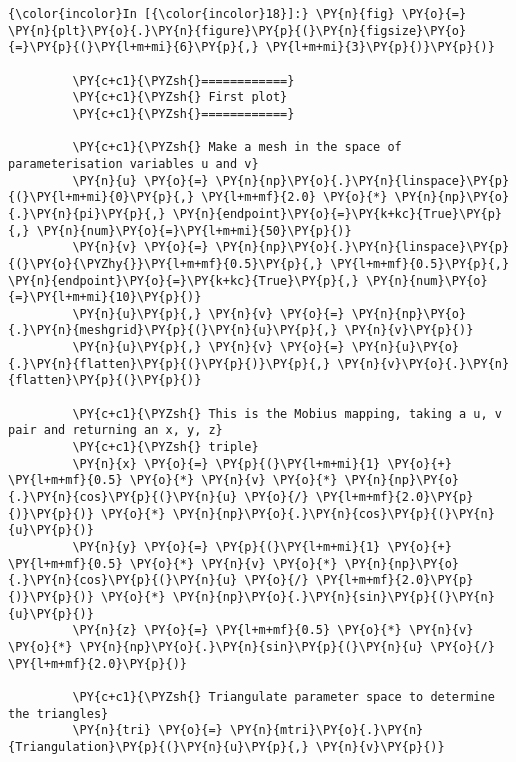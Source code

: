     \begin{Verbatim}[commandchars=\\\{\},frame=single,framerule=0.3mm,rulecolor=\color{cellframecolor}]
{\color{incolor}In [{\color{incolor}18}]:} \PY{n}{fig} \PY{o}{=} \PY{n}{plt}\PY{o}{.}\PY{n}{figure}\PY{p}{(}\PY{n}{figsize}\PY{o}{=}\PY{p}{(}\PY{l+m+mi}{6}\PY{p}{,} \PY{l+m+mi}{3}\PY{p}{)}\PY{p}{)}
         
         \PY{c+c1}{\PYZsh{}============}
         \PY{c+c1}{\PYZsh{} First plot}
         \PY{c+c1}{\PYZsh{}============}
         
         \PY{c+c1}{\PYZsh{} Make a mesh in the space of parameterisation variables u and v}
         \PY{n}{u} \PY{o}{=} \PY{n}{np}\PY{o}{.}\PY{n}{linspace}\PY{p}{(}\PY{l+m+mi}{0}\PY{p}{,} \PY{l+m+mf}{2.0} \PY{o}{*} \PY{n}{np}\PY{o}{.}\PY{n}{pi}\PY{p}{,} \PY{n}{endpoint}\PY{o}{=}\PY{k+kc}{True}\PY{p}{,} \PY{n}{num}\PY{o}{=}\PY{l+m+mi}{50}\PY{p}{)}
         \PY{n}{v} \PY{o}{=} \PY{n}{np}\PY{o}{.}\PY{n}{linspace}\PY{p}{(}\PY{o}{\PYZhy{}}\PY{l+m+mf}{0.5}\PY{p}{,} \PY{l+m+mf}{0.5}\PY{p}{,} \PY{n}{endpoint}\PY{o}{=}\PY{k+kc}{True}\PY{p}{,} \PY{n}{num}\PY{o}{=}\PY{l+m+mi}{10}\PY{p}{)}
         \PY{n}{u}\PY{p}{,} \PY{n}{v} \PY{o}{=} \PY{n}{np}\PY{o}{.}\PY{n}{meshgrid}\PY{p}{(}\PY{n}{u}\PY{p}{,} \PY{n}{v}\PY{p}{)}
         \PY{n}{u}\PY{p}{,} \PY{n}{v} \PY{o}{=} \PY{n}{u}\PY{o}{.}\PY{n}{flatten}\PY{p}{(}\PY{p}{)}\PY{p}{,} \PY{n}{v}\PY{o}{.}\PY{n}{flatten}\PY{p}{(}\PY{p}{)}
         
         \PY{c+c1}{\PYZsh{} This is the Mobius mapping, taking a u, v pair and returning an x, y, z}
         \PY{c+c1}{\PYZsh{} triple}
         \PY{n}{x} \PY{o}{=} \PY{p}{(}\PY{l+m+mi}{1} \PY{o}{+} \PY{l+m+mf}{0.5} \PY{o}{*} \PY{n}{v} \PY{o}{*} \PY{n}{np}\PY{o}{.}\PY{n}{cos}\PY{p}{(}\PY{n}{u} \PY{o}{/} \PY{l+m+mf}{2.0}\PY{p}{)}\PY{p}{)} \PY{o}{*} \PY{n}{np}\PY{o}{.}\PY{n}{cos}\PY{p}{(}\PY{n}{u}\PY{p}{)}
         \PY{n}{y} \PY{o}{=} \PY{p}{(}\PY{l+m+mi}{1} \PY{o}{+} \PY{l+m+mf}{0.5} \PY{o}{*} \PY{n}{v} \PY{o}{*} \PY{n}{np}\PY{o}{.}\PY{n}{cos}\PY{p}{(}\PY{n}{u} \PY{o}{/} \PY{l+m+mf}{2.0}\PY{p}{)}\PY{p}{)} \PY{o}{*} \PY{n}{np}\PY{o}{.}\PY{n}{sin}\PY{p}{(}\PY{n}{u}\PY{p}{)}
         \PY{n}{z} \PY{o}{=} \PY{l+m+mf}{0.5} \PY{o}{*} \PY{n}{v} \PY{o}{*} \PY{n}{np}\PY{o}{.}\PY{n}{sin}\PY{p}{(}\PY{n}{u} \PY{o}{/} \PY{l+m+mf}{2.0}\PY{p}{)}
         
         \PY{c+c1}{\PYZsh{} Triangulate parameter space to determine the triangles}
         \PY{n}{tri} \PY{o}{=} \PY{n}{mtri}\PY{o}{.}\PY{n}{Triangulation}\PY{p}{(}\PY{n}{u}\PY{p}{,} \PY{n}{v}\PY{p}{)}
         

\end{Verbatim}

